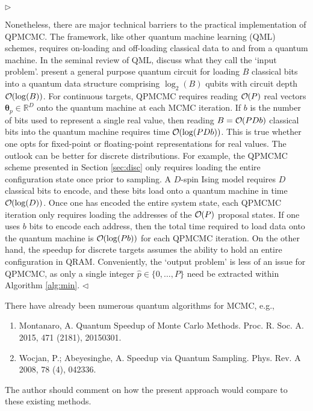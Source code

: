 \documentclass[12pt]{article}
\newenvironment{reply}{$\triangleright$\bfseries}{$\triangleleft$}
\renewenvironment{quote}
               {\list{}{\rightmargin\leftmargin}%
                \item\relax\normalfont}
               {\endlist}
\newcommand{\order}[1]{{\cal O}\hspace{-0.2em}\left( #1 \right)}
\newcommand{\ttheta}{\boldsymbol{\theta}}
\begin{document}
\begin{reply}
	\begin{quote}
Nonetheless, there are major technical barriers to the practical implementation of QPMCMC.  The framework, like other quantum machine learning (QML) schemes, requires on-loading and off-loading classical data to and from a quantum machine.  In the seminal review of QML, \citet{biamonte2017quantum} discuss what they call the `input problem'.  \citet{cortese2018loading} present a general purpose quantum circuit for loading $B$ classical bits into a quantum data structure comprising $\log_2 (B)$ qubits with circuit depth $\order{\log (B)}$.  For continuous targets, QPMCMC requires reading $\order{P}$ real vectors $\ttheta_p\in \mathbb{R}^D$ onto the quantum machine at each MCMC iteration.  If $b$ is the number of bits used to represent a single real value, then reading $B=\order{PDb}$ classical bits into the quantum machine requires time $\order{\log (PDb)}$.  This is true whether one opts for fixed-point \citep{jordan2005fast} or floating-point \citep{haener2018quantum} representations for real values.  The outlook can be better for discrete distributions.  For example, the QPMCMC scheme presented in Section \ref{sec:disc} only requires loading the entire configuration state once prior to sampling.  A $D$-spin Ising model requires $D$ classical bits to encode, and these bits load onto a quantum machine in time $\order{\log(D)}$.  Once one has encoded the entire system state, each QPMCMC iteration only requires loading the addresses of the $\order{P}$ proposal states. If one uses $b$ bits to encode each address, then the total time required to load data onto the quantum machine is $\order{\log(Pb)}$ for each QPMCMC iteration.  On the other hand, the speedup for discrete targets assumes the ability to hold an entire configuration in QRAM.
Conveniently, the `output problem' is less of an issue for QPMCMC, as only a single integer $\hat{p} \in \{0,\dots,P\}$ need be extracted within Algorithm \ref{alg:min}.
	\end{quote}
\end{reply}

There have already been numerous quantum algorithms for MCMC, e.g.,
\begin{enumerate}
	\item Montanaro, A. Quantum Speedup of Monte Carlo Methods. Proc. R. Soc. A. 2015, 471 (2181), 20150301. \citep{montanaro}
	
	\item Wocjan, P.; Abeyesinghe, A. Speedup via Quantum Sampling. Phys. Rev. A 2008, 78 (4), 042336. \citep{wocjan2008speedup}
\end{enumerate}
The author should comment on how the present approach would compare to these existing methods.
\end{document}

